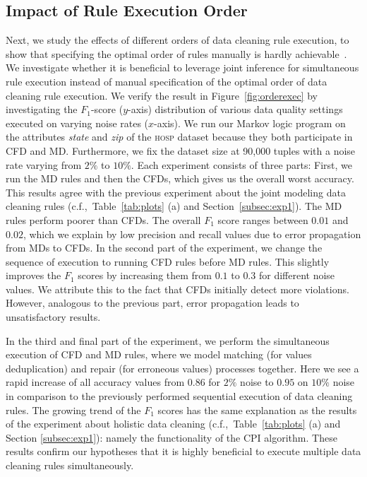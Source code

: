 \subsection{Impact of Rule Execution Order}
\label{subsec:exp3}
Next, we study the effects of different orders of data cleaning rule execution, to show that specifying the optimal order of rules manually is hardly achievable~\cite{Dallachiesa:2013:NCD:2463676.2465327}. We investigate whether it is beneficial to leverage joint inference for simultaneous rule execution instead of manual specification of the optimal order of data cleaning rule execution. We verify the result in Figure~\ref{fig:orderexec} by investigating the $F_1$-score ($y$-axis) distribution of various data quality settings executed on varying noise rates ($x$-axis). We run our Markov logic program on the attributes \textsl{state} and \textsl{zip} of the \textsc{hosp} dataset because they both participate in CFD and MD. Furthermore, we fix the dataset size at 90,000 tuples with a noise rate varying from $2\%$ to $10\%$. Each experiment consists of three parts: First, we run the MD rules and then the CFDs, which gives us the overall worst accuracy. This results agree with the previous experiment about the joint modeling data cleaning rules (c.f.,~Table~\ref{tab:plots} (a) and Section~\ref{subsec:exp1}). The MD rules perform poorer than CFDs. The overall $F_1$ score ranges between $0.01$ and $0.02$, which we explain by low precision and recall values due to error propagation from MDs to CFDs.  
In the second part of the experiment, we change the sequence of execution to running CFD rules before MD rules. This slightly improves the $F_1$ scores by increasing them from $0.1$ to $0.3$ for different noise values. We attribute this to the fact that CFDs initially detect more violations. However, analogous to the previous part, error propagation leads to unsatisfactory results. 

In the third and final part of the experiment, we perform the simultaneous execution of CFD and MD rules, where we model matching (for values deduplication) and repair (for erroneous values) processes together. Here we see a rapid increase of all accuracy values from $0.86$ for $2\%$ noise to $0.95$ on $10\%$ noise in comparison to the previously performed sequential execution of data cleaning rules. The growing trend of the $F_1$ scores has the same explanation as the results of the experiment about holistic data cleaning (c.f.,~Table~\ref{tab:plots} (a) and Section \ref{subsec:exp1}): namely the functionality of the CPI algorithm. These results confirm our hypotheses that it is highly beneficial to execute multiple data cleaning rules simultaneously.  

